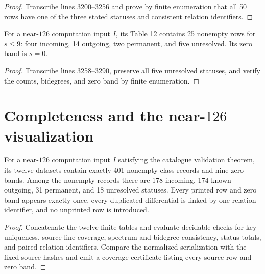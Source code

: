 \begin{proof}
  Transcribe lines 3200--3256 and prove by finite enumeration that all 50 rows
  have one of the three stated statuses and consistent relation identifiers.
\end{proof}

\begin{proposition}
  \label{data:table-s127-low}
  \notready
  For a near-$126$ computation input $I$, its Table 12 contains 25 nonempty rows
  for $s\le9$: four incoming, 14 outgoing, two permanent, and five unresolved.
  Its zero band is $s=0$.
\end{proposition}

\begin{proof}
  Transcribe lines 3258--3290, preserve all five unresolved statuses, and
  verify the counts, bidegrees, and zero band by finite enumeration.
\end{proof}

\section{Completeness and the near-$126$ visualization}

\begin{theorem}
  \label{thm:appendix-all-rows-encoded}
  \notready
  For a near-$126$ computation input $I$ satisfying the catalogue validation
  theorem, its twelve datasets contain exactly 401 nonempty class records and
  nine zero bands.  Among the nonempty records there are 178 incoming, 174 known
  outgoing, 31 permanent, and 18 unresolved statuses.  Every printed row and
  zero band appears exactly once, every duplicated differential is linked by
  one relation identifier, and no unprinted row is introduced.
\end{theorem}

\begin{proof}
  Concatenate the twelve finite tables and evaluate decidable checks for key
  uniqueness, source-line coverage, spectrum and bidegree consistency, status
  totals, and paired relation identifiers.  Compare the normalized
  serialization with the fixed source hashes and emit a coverage certificate
  listing every source row and zero band.
\end{proof}

